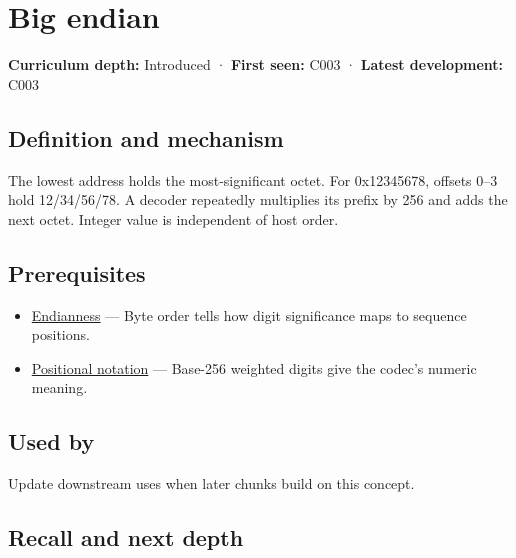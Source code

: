 \hypertarget{appendix-92e040df969a}{}\label{referencestart:appendix-92e040df969a}
\section{Big endian}\label{appendix-92e040df969a-big-endian}

\textbf{Curriculum depth:} Introduced · \textbf{First seen:} C003 · \textbf{Latest development:} C003

\begin{allmightroledefinition}

\subsection{Definition and mechanism}\label{appendix-92e040df969a-definition-and-mechanism}

The lowest address holds the most-significant octet. For 0x12345678, offsets 0--3 hold 12/34/56/78. A decoder repeatedly multiplies its prefix by 256 and adds the next octet. Integer value is independent of host order.

\end{allmightroledefinition}

\subsection{Prerequisites}\label{appendix-92e040df969a-prerequisites}

\begin{itemize}
\tightlist
\item
  \hyperref[appendix-bc07c3d25b18]{Endianness} --- Byte order tells how digit significance maps to sequence positions.
\item
  \hyperref[appendix-83c3f28f7bda]{Positional notation} --- Base-256 weighted digits give the codec's numeric meaning.
\end{itemize}

\subsection{Used by}\label{appendix-92e040df969a-used-by}

Update downstream uses when later chunks build on this concept.

\subsection{Recall and next depth}\label{appendix-92e040df969a-recall-and-next-depth}

